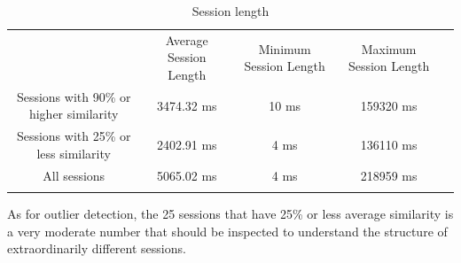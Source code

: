 \begin{table}[h!]
\centering
\caption{Session length}
\label{tab:sessionlength}
\begin{tabular}{ccccl}
\cline{1-4}
\multicolumn{1}{|c|}{}                                        & \multicolumn{1}{c|}{Average Session Length} & \multicolumn{1}{c|}{Minimum Session Length} & \multicolumn{1}{c|}{Maximum Session Length} &  \\ \cline{1-4}
\multicolumn{1}{|c|}{Sessions with 90\% or higher similarity} & \multicolumn{1}{c|}{3474.32 ms}                      & \multicolumn{1}{c|}{10 ms}                      & \multicolumn{1}{c|}{159320 ms}                      &  \\ \cline{1-4}
\multicolumn{1}{|c|}{Sessions with 25\% or less similarity} & \multicolumn{1}{c|}{2402.91 ms}                      & \multicolumn{1}{c|}{4 ms}                      & \multicolumn{1}{c|}{136110 ms}                      &  \\ \cline{1-4}
\multicolumn{1}{|c|}{All sessions}                            & \multicolumn{1}{c|}{5065.02 ms}                      & \multicolumn{1}{c|}{4 ms}                      & \multicolumn{1}{c|}{218959 ms}                      &  \\ \cline{1-4}
\multicolumn{1}{l}{}                                          & \multicolumn{1}{l}{}                        & \multicolumn{1}{l}{}                        & \multicolumn{1}{l}{}                        & 
\end{tabular}
\end{table}

As for outlier detection, the 25 sessions that have 25\% or less average similarity is a very moderate number that should be inspected to understand the structure of extraordinarily different sessions.






